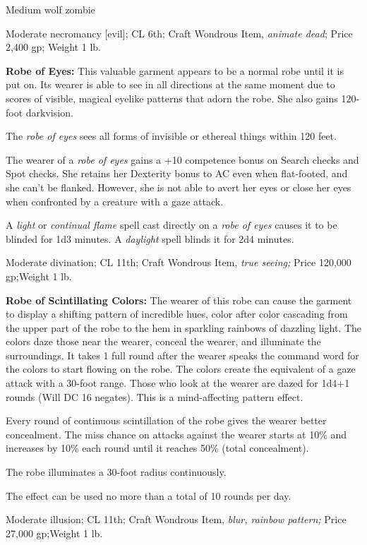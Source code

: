 \documentclass{article}
\begin{document}
\parindent=7pt
Medium wolf zombie

\parindent=0pt
Moderate necromancy [evil]; CL 6th; Craft Wondrous Item, \textit{animate dead}; 
Price 2,400 gp; Weight 1 lb.

\textbf{Robe of Eyes:} This valuable garment appears to be a normal robe until 
it is put on. Its wearer is able to see in all directions at the same moment due 
to scores of visible, magical eyelike patterns that adorn the robe. She also gains 
120-foot darkvision.

The \textit{robe of eyes }sees all forms of invisible or ethereal things within 
120 feet.

The wearer of a \textit{robe of eyes }gains a +10 competence bonus on Search checks 
and Spot checks. She retains her Dexterity bonus to AC even when flat-footed, and 
she can't be flanked. However, she is not able to avert her eyes or close her eyes 
when confronted by a creature with a gaze attack.

A \textit{light }or \textit{continual flame }spell cast directly on a \textit{robe 
of eyes }causes it to be blinded for 1d3 minutes. A \textit{daylight }spell blinds 
it for 2d4 minutes.

Moderate divination; CL 11th; Craft Wondrous Item, \textit{true seeing; }Price 
120,000 gp;Weight 1 lb.

\textbf{Robe of Scintillating Colors:} The wearer of this robe can cause the garment 
to display a shifting pattern of incredible hues, color after color cascading from 
the upper part of the robe to the hem in sparkling rainbows of dazzling light. 
The colors daze those near the wearer, conceal the wearer, and illuminate the surroundings. 
It takes 1 full round after the wearer speaks the command word for the colors to 
start flowing on the robe. The colors create the equivalent of a gaze attack with 
a 30-foot range. Those who look at the wearer are dazed for 1d4+1 rounds (Will 
DC 16 negates). This is a mind-affecting pattern effect.

Every round of continuous scintillation of the robe gives the wearer better concealment. 
The miss chance on attacks against the wearer starts at 10\% and increases by 10\% 
each round until it reaches 50\% (total concealment).

The robe illuminates a 30-foot radius continuously.

The effect can be used no more than a total of 10 rounds per day.

Moderate illusion; CL 11th; Craft Wondrous Item, \textit{blur, rainbow pattern; 
}Price 27,000 gp;Weight 1 lb.
\end{document}
